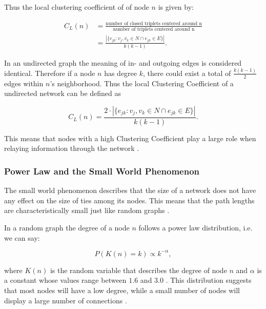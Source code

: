 Thus the local clustering coefficient of of node $n$ is given by:

\begin{align}
C_L(n) &= \frac{\text{number of closed triplets centered around n}}{\text{number of triplets centered around n}} \nonumber \\
       &= \frac{|\{ e_{jk}: v_j, v_k \in N \cap e_{jk} \in E \}|}{k(k-1)}. 
\end{align}

In an undirected graph the meaning of in- and outgoing edges is considered identical. Therefore if a node $n$ has degree $k$, there could exist a total of $\frac{k(k-1)}{2}$ edges within $n$'s neighborhood. Thus the local Clustering Coefficient of a undirected network can be defined as

\begin{equation}
C_L(n) = \frac{2\cdot |\{ e_{jk}: v_j, v_k \in N \cap e_{jk} \in E \}|}{k(k-1)}.
\end{equation}

This means that nodes with a high Clustering Coefficient play a large role when relaying information through the network \cite{graphbs}.

\subsubsection{Power Law and the Small World Phenomenon}

The small world phenomenon describes that the size of a network does not have any effect on the size of ties among its nodes. This means that the path lengths are characteristically small just like random graphs \cite{graphcluster}.

In a random graph the degree of a node $n$ follows a power law distribution, i.e. we can say:

\begin{equation}
P\left(K(n)=k\right) \propto k^{-\alpha},
\end{equation}

where $K(n)$ is the random variable that describes the degree of node $n$ and $\alpha$ is a constant whose values range between $1.6$ and $3.0$ \cite{Newman2003}. This distribution suggests that most nodes will have a low degree, while a small number of nodes will display a large number of connections \cite{powerlaw}.